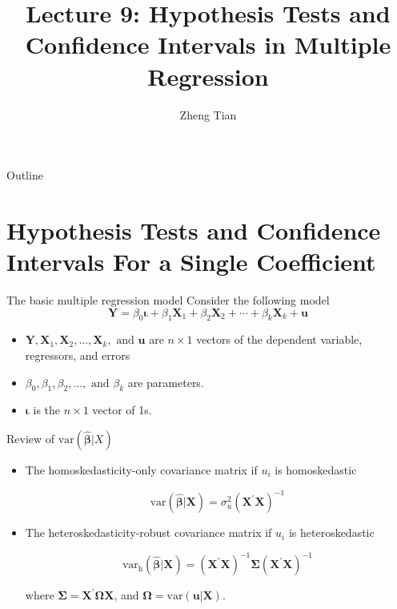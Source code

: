 \documentclass[presentation,10pt]{beamer}
\author{Zheng Tian}
\date{}
\title{Lecture 9: Hypothesis Tests and Confidence Intervals in Multiple Regression}
\newcommand{\var}{\mathrm{var}}
\begin{document}
\maketitle
\begin{frame}{Outline}
\setcounter{tocdepth}{1}
\tableofcontents
\end{frame}



\section{Hypothesis Tests and Confidence Intervals For a Single Coefficient}
\label{sec:org121d0e1}
\setcounter{tocdepth}{1}
\tableofcontents[currentsection]
\begin{frame}[label={sec:orga1a52f1}]{The basic multiple regression model}
Consider the following model
\begin{equation}
\label{eq:jnt-hyp-mod}
\mathbf{Y} = \beta_0 \boldsymbol{\iota} + \beta_1 \mathbf{X}_1 + \beta_2 \mathbf{X}_2 + \cdots + \beta_k \mathbf{X}_k + \mathbf{u}
\end{equation}
\begin{itemize}
\item \(\mathbf{Y}, \mathbf{X}_1, \mathbf{X}_2, \ldots, \mathbf{X}_k, \text{ and } \mathbf{u}\) are \(n
  \times 1\) vectors of the dependent variable, regressors, and
errors
\item \(\beta_0, \beta_1, \beta_2, \ldots, \text{ and } \beta_k\) are
parameters.
\item \(\boldsymbol{\iota}\) is the \(n \times 1\) vector of 1s.
\end{itemize}
\end{frame}

\begin{frame}[label={sec:orgf0fba73}]{Review of \(\var(\hat{\boldsymbol{\beta}}|X)\)}
\begin{itemize}
\item The homoskedasticity-only covariance matrix if \(u_i\) is
homoskedastic

\begin{equation}
\label{eq:varbhat-hm-1}
\var(\hat{\boldsymbol{\beta}} | \mathbf{X}) = \sigma^2_u (\mathbf{X}^{\prime} \mathbf{X})^{-1}
\end{equation}

\item The heteroskedasticity-robust covariance matrix if \(u_i\) is
heteroskedastic

\begin{equation}
\label{eq:varbhat-ht-1}
\var_{\mathrm{h}}(\hat{\boldsymbol{\beta}} | \mathbf{X}) = \left(\mathbf{X}^{\prime} \mathbf{X}\right)^{-1} \boldsymbol{\Sigma} (\mathbf{X}^{\prime} \mathbf{X})^{-1}
\end{equation}

where \(\boldsymbol{\Sigma} = \mathbf{X}^{\prime} \boldsymbol{\Omega}
  \mathbf{X}\), and \(\boldsymbol{\Omega} = \var(\mathbf{u} |
  \mathbf{X})\).
\end{itemize}
\end{frame}
\end{document}
